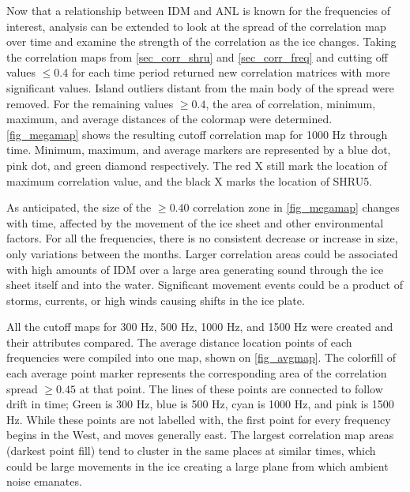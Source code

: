Now that a relationship between IDM and ANL is known for the frequencies of interest, analysis can be extended to look at the spread of the correlation map over time and examine the strength of the correlation as the ice changes. Taking the correlation maps from \autoref{sec_corr_shru} and \autoref{sec_corr_freq} and cutting off values $\leq 0.4$ for each time period returned new correlation matrices with more significant values. Island outliers distant from the main body of the spread were removed. For the remaining values $\geq 0.4$, the area of correlation, minimum, maximum, and average distances of the colormap were determined. \autoref{fig_megamap} shows the resulting cutoff correlation map for 1000 Hz through time. Minimum, maximum, and average markers are represented by a blue dot, pink dot, and green diamond respectively. The red X still mark the location of maximum correlation value, and the black X marks the location of SHRU5.

As anticipated, the size of the $\geq 0.40$ correlation zone in \autoref{fig_megamap} changes with time, affected by the movement of the ice sheet and other environmental factors. For all the frequencies, there is no consistent decrease or increase in size, only variations between the months. Larger correlation areas could be associated with high amounts of IDM over a large area generating sound through the ice sheet itself and into the water. Significant movement events could be a product of storms, currents, or high winds causing shifts in the ice plate. %

All the cutoff maps for 300 Hz, 500 Hz, 1000 Hz, and 1500 Hz were created and their attributes compared. The average distance location points of each frequencies were compiled into one map, shown on \autoref{fig_avgmap}. The colorfill of each average point marker represents the corresponding area of the correlation spread $\geq 0.45$ at that point. The lines of these points are connected to follow drift in time; Green is 300 Hz, blue is 500 Hz, cyan is 1000 Hz, and pink is 1500 Hz. While these points are not labelled with, the first point for every frequency begins in the West, and moves generally east. The largest correlation map areas (darkest point fill) tend to cluster in the same places at similar times, which could be large movements in the ice creating a large plane from which ambient noise emanates.

